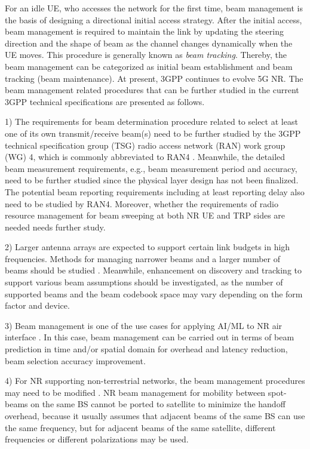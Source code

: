 \documentclass[journal,comsoc]{IEEEtran}
\begin{document}
For an idle UE, who accesses the network for the first time, beam management is the basis of designing a directional initial access strategy. After the initial access, beam management is required to maintain the link by updating the steering direction and the shape of beam as the channel changes dynamically when the UE moves. This procedure is generally known as \emph{beam tracking}. Thereby, the beam management can be categorized as initial beam establishment and beam tracking (beam maintenance). At present, 3GPP continues to evolve 5G NR. The beam management related procedures that can be further studied in the current 3GPP technical specifications are presented as follows.

1) The requirements for beam determination procedure related to select at least one of its own transmit/receive beam(s) need to be further studied by the 3GPP technical specification group (TSG) radio access network (RAN) work group (WG) 4, which is commonly abbreviated to RAN4 \cite{3GPP-TR-38803}. Meanwhile, the detailed beam measurement requirements, e.g., beam measurement period and accuracy, need to be further studied since the physical layer design has not been finalized. The potential beam reporting requirements including at least reporting delay also need to be studied by RAN4. Moreover, whether the requirements of radio resource management for beam sweeping at both NR UE and TRP sides are needed needs further study.

2) Larger antenna arrays are expected to support certain link budgets in high frequencies. Methods for managing narrower beams and a larger number of beams should be studied \cite{3GPP-TR-38807}. Meanwhile, enhancement on discovery and tracking to support various beam assumptions should be investigated, as the number of supported beams and the beam codebook space may vary depending on the form factor and device.

3) Beam management is one of the use cases for applying AI/ML to NR air interface \cite{3GPP-TR-38843}. In this case, beam management can be carried out in terms of beam prediction in time and/or spatial domain for overhead and latency reduction, beam selection accuracy improvement.


4) For NR supporting non-terrestrial networks, the beam management procedures may need to be modified \cite{3GPP-TR-38811}. NR beam management for mobility between spot-beams on the same BS cannot be ported to satellite to minimize the handoff overhead, because it usually assumes that adjacent beams of the same BS can use the same frequency, but for adjacent beams of the same satellite, different frequencies or different polarizations may be used.
\end{document}
